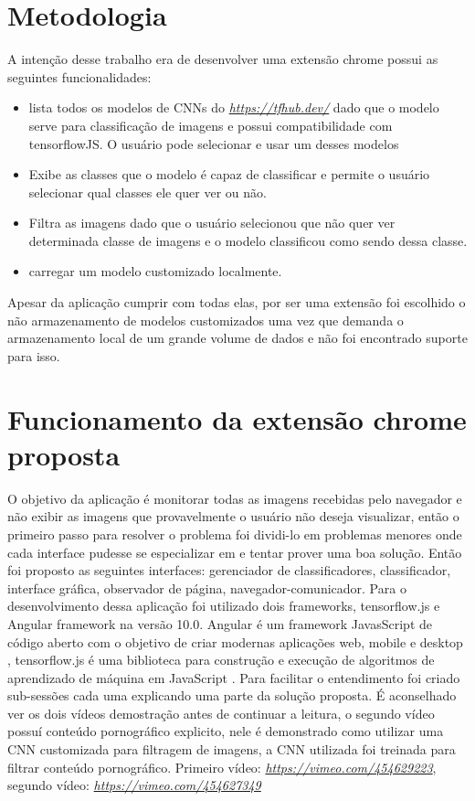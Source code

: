 \documentclass[conference]{IEEEtran}
\begin{document}
\section{Metodologia}\label{methodology} 
A intenção desse trabalho era de desenvolver uma extensão chrome possui as seguintes funcionalidades:
\begin{itemize}
	\item lista todos os modelos de CNNs do \textit{\url{https://tfhub.dev/}} dado que o modelo serve para classificação de imagens e possui compatibilidade com tensorflowJS. O usuário pode selecionar e usar um desses modelos
	\item Exibe as classes que o modelo é capaz de classificar e permite o usuário selecionar qual classes ele quer ver  ou não.
	\item Filtra as imagens dado que o usuário selecionou que não quer ver determinada classe de imagens e o modelo classificou como sendo dessa classe.
	\item carregar um modelo customizado localmente.
\end{itemize}
Apesar da aplicação cumprir com todas elas, por ser uma extensão foi escolhido o não armazenamento de modelos customizados uma vez que demanda o armazenamento local de um grande volume de dados e não foi encontrado suporte para isso. 
\section{Funcionamento da extensão chrome proposta }\label{howMyExtensionWorks} 
O objetivo da aplicação é monitorar todas as imagens recebidas pelo navegador e não exibir as imagens que provavelmente o usuário não deseja visualizar, então o primeiro passo para resolver o problema foi dividi-lo em problemas menores onde cada interface pudesse se especializar em e tentar prover uma boa solução. Então 
foi proposto as seguintes interfaces: gerenciador de classificadores, classificador, interface gráfica, observador de página, navegador-comunicador. Para o desenvolvimento dessa aplicação foi utilizado dois frameworks, tensorflow.js e Angular framework na versão 10.0. Angular é um framework JavasScript de código aberto com o objetivo de criar modernas aplicações web, mobile e desktop \cite{kasagoni2017building}, tensorflow.js é uma biblioteca para construção e execução de algoritmos de aprendizado de máquina em JavaScript \cite{smilkov2019tensorflow}. Para facilitar o entendimento  foi criado sub-sessões cada uma explicando uma parte da solução proposta. É aconselhado ver os dois vídeos demostração antes de continuar a leitura, o segundo vídeo possuí conteúdo pornográfico explicito, nele é demonstrado como utilizar uma CNN customizada para filtragem de imagens, a CNN utilizada foi treinada para filtrar conteúdo pornográfico. Primeiro vídeo: \textit{\url{https://vimeo.com/454629223}}, segundo vídeo: \textit{\url{https://vimeo.com/454627349}}
\end{document}
